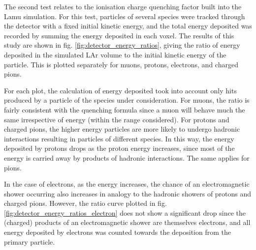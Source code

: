 The second test relates to the ionisation charge quenching factor built into the Lamu simulation. For this test, particles of several species were tracked through the detector with a fixed initial kinetic energy, and the total energy deposited was recorded by summing the energy deposited in each voxel. The results of this study are shown in fig. \ref{fig:detector_energy_ratios}, giving the ratio of energy deposited in the simulated \ac{LAr} volume to the initial kinetic energy of the particle. This is plotted separately for muons, protons, electrons, and charged pions.

For each plot, the calculation of energy deposited took into account only hits produced by a particle of the species under consideration. For muons, the ratio is fairly consistent with the quenching formula since a muon will behave much the same irrespective of energy (within the range considered). For protons and charged pions, the higher energy particles are more likely to undergo hadronic interactions resulting in particles of different species. In this way, the energy deposited by protons drops as the proton energy increases, since most of the energy is carried away by products of hadronic interactions. The same applies for pions.

In the case of electrons, as the energy increases, the chance of an electromagnetic shower occurring also increases in analogy to the hadronic showers of protons and charged pions. However, the ratio curve plotted in fig. \ref{fig:detector_energy_ratios_electron} does not show a significant drop since the (charged) products of an electromagnetic shower are themselves electrons, and all energy deposited by electrons was counted towards the deposition from the primary particle.

